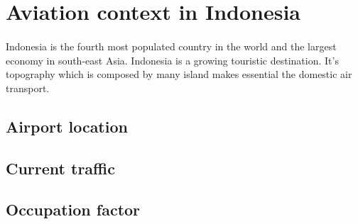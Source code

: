 \section{Aviation context in Indonesia}
\paragraph{} Indonesia is the fourth most populated country in the world and the largest economy in
south-east Asia.
Indonesia is a growing touristic destination.
It’s topography which is composed by many island makes essential the domestic air
transport.
	\subsection{Airport location}
	\subsection{Current traffic}
	\subsection{Occupation factor}
